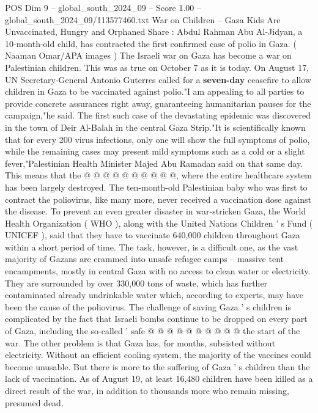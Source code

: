 \begin{textsample}{POS Dim 9 – global\_south\_2024\_09 – Score 1.00 – global\_south\_2024\_09/113577460.txt}  \label{ex:f9_pos_257}
War on Children -- Gaza Kids Are Unvaccinated, Hungry and Orphaned Share : Abdul Rahman Abu Al-Jidyan, a 10-month-old child, has contracted the first confirmed case of polio in Gaza. ( Naaman Omar/APA images ) The Israeli war on Gaza has become a war on Palestinian children.
This was as true on October 7 as it is today.
On August 17, UN Secretary-General Antonio Guterres called for a \textbf{seven-day} ceasefire to allow children in Gaza to be vaccinated against polio."I am appealing to all parties to provide concrete assurances right away, guaranteeing humanitarian pauses for the campaign,"he said.
The first such case of the devastating epidemic was discovered in the town of Deir Al-Balah in the central Gaza Strip."It is scientifically known that for every 200 virus infections, only one will show the full symptoms of polio, while the remaining cases may present mild symptoms such as a cold or a slight fever,"Palestinian Health Minister Majed Abu Ramadan said on that same day.
This means that the @ @ @ @ @ @ @ @ @ @, where the entire healthcare system has been largely destroyed.
The ten-month-old Palestinian baby who was first to contract the poliovirus, like many more, never received a vaccination dose against the disease.
To prevent an even greater disaster in war-stricken Gaza, the World Health Organization ( WHO ), along with the United Nations Children ' s Fund ( UNICEF ), said that they have to vaccinate 640,000 children throughout Gaza within a short period of time.
The task, however, is a difficult one, as the vast majority of Gazans are crammed into unsafe refugee camps -- massive tent encampments, mostly in central Gaza with no access to clean water or electricity.
They are surrounded by over 330,000 tons of waste, which has further contaminated already undrinkable water which, according to experts, may have been the cause of the poliovirus.
The challenge of saving Gaza ' s children is complicated by the fact that Israeli bombs continue to be dropped on every part of Gaza, including the so-called ' safe @ @ @ @ @ @ @ @ @ @ the start of the war.
The other problem is that Gaza has, for months, subsisted without electricity.
Without an efficient cooling system, the majority of the vaccines could become unusable.
But there is more to the suffering of Gaza ' s children than the lack of vaccination.
As of August 19, at least 16,480 children have been killed as a direct result of the war, in addition to thousands more who remain missing, presumed dead.

\end{textsample}
